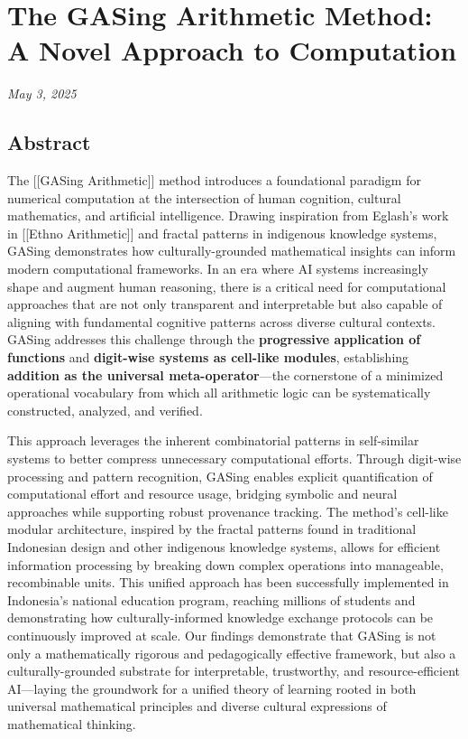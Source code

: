 \section{The GASing Arithmetic Method: A Novel Approach to Computation}
\emph{May 3, 2025}

\subsection{Abstract}
The [[GASing Arithmetic]] method introduces a foundational paradigm for numerical computation at the intersection of human cognition, cultural mathematics, and artificial intelligence. Drawing inspiration from Eglash's work in [[Ethno Arithmetic]] and fractal patterns in indigenous knowledge systems, GASing demonstrates how culturally-grounded mathematical insights can inform modern computational frameworks. In an era where AI systems increasingly shape and augment human reasoning, there is a critical need for computational approaches that are not only transparent and interpretable but also capable of aligning with fundamental cognitive patterns across diverse cultural contexts. GASing addresses this challenge through the \textbf{progressive application of functions} and \textbf{digit-wise systems as cell-like modules}, establishing \textbf{addition as the universal meta-operator}—the cornerstone of a minimized operational vocabulary from which all arithmetic logic can be systematically constructed, analyzed, and verified. 

This approach leverages the inherent combinatorial patterns in self-similar systems to better compress unnecessary computational efforts. Through digit-wise processing and pattern recognition, GASing enables explicit quantification of computational effort and resource usage, bridging symbolic and neural approaches while supporting robust provenance tracking. The method's cell-like modular architecture, inspired by the fractal patterns found in traditional Indonesian design and other indigenous knowledge systems, allows for efficient information processing by breaking down complex operations into manageable, recombinable units. This unified approach has been successfully implemented in Indonesia's national education program, reaching millions of students and demonstrating how culturally-informed knowledge exchange protocols can be continuously improved at scale. Our findings demonstrate that GASing is not only a mathematically rigorous and pedagogically effective framework, but also a culturally-grounded substrate for interpretable, trustworthy, and resource-efficient AI—laying the groundwork for a unified theory of learning rooted in both universal mathematical principles and diverse cultural expressions of mathematical thinking.

